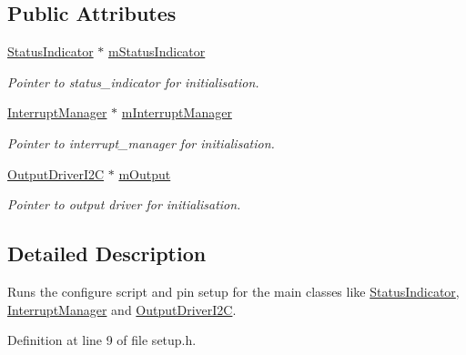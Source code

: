 \subsection*{Public Attributes}
\begin{DoxyCompactItemize}
\item 
\hyperlink{classSPMB_1_1StatusIndicator}{Status\+Indicator} $\ast$ \hyperlink{classSPMB_1_1SetupManager_aee4ada747a7d535d75ae4e54e1396c5f}{m\+Status\+Indicator}\hypertarget{classSPMB_1_1SetupManager_aee4ada747a7d535d75ae4e54e1396c5f}{}\label{classSPMB_1_1SetupManager_aee4ada747a7d535d75ae4e54e1396c5f}

\begin{DoxyCompactList}\small\item\em Pointer to status\+\_\+indicator for initialisation. \end{DoxyCompactList}\item 
\hyperlink{classSPMB_1_1InterruptManager}{Interrupt\+Manager} $\ast$ \hyperlink{classSPMB_1_1SetupManager_a29f2062c536ba2b74bda1937e10d3351}{m\+Interrupt\+Manager}\hypertarget{classSPMB_1_1SetupManager_a29f2062c536ba2b74bda1937e10d3351}{}\label{classSPMB_1_1SetupManager_a29f2062c536ba2b74bda1937e10d3351}

\begin{DoxyCompactList}\small\item\em Pointer to interrupt\+\_\+manager for initialisation. \end{DoxyCompactList}\item 
\hyperlink{classSPMB_1_1OutputDriverI2C}{Output\+Driver\+I2C} $\ast$ \hyperlink{classSPMB_1_1SetupManager_a3cd847b570298f79a6a9d1d86e556377}{m\+Output}\hypertarget{classSPMB_1_1SetupManager_a3cd847b570298f79a6a9d1d86e556377}{}\label{classSPMB_1_1SetupManager_a3cd847b570298f79a6a9d1d86e556377}

\begin{DoxyCompactList}\small\item\em Pointer to output driver for initialisation. \end{DoxyCompactList}\end{DoxyCompactItemize}


\subsection{Detailed Description}
Runs the configure script and pin setup for the main classes like \hyperlink{classSPMB_1_1StatusIndicator}{Status\+Indicator}, \hyperlink{classSPMB_1_1InterruptManager}{Interrupt\+Manager} and \hyperlink{classSPMB_1_1OutputDriverI2C}{Output\+Driver\+I2C}. 

Definition at line 9 of file setup.\+h.

